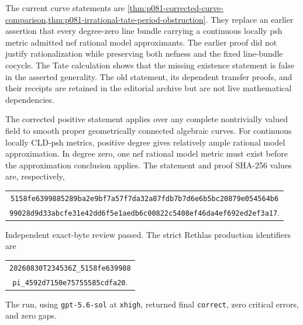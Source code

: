 The current curve statements are
\cref{thm:p081-corrected-curve-comparison,thm:p081-irrational-tate-period-obstruction}.
They replace an earlier assertion that every degree-zero line bundle
carrying a continuous locally psh metric admitted nef rational model
approximants.  The earlier proof did not justify rationalization while
preserving both nefness and the fixed line-bundle cocycle.  The Tate
calculation shows that the missing existence statement is false in
the asserted generality.  The old statement, its dependent transfer
proofs, and their receipts are retained in the editorial archive but are
not live mathematical dependencies.

The corrected positive statement applies over any complete nontrivially
valued field to smooth proper geometrically connected algebraic curves.
For continuous locally CLD-psh metrics, positive degree gives relatively
ample rational model approximation.  In degree zero, one nef rational
model metric must exist
before the approximation conclusion applies.  The statement and proof
SHA-256 values are, respectively,
\begin{center}
\small
\begin{tabular}{@{}c@{}}
\nolinkurl{5158fe6399885289ba2e9bf7a57f7da32a87fdb7b7d6e6b5bc20879e054564b6}\\
\nolinkurl{99028d9d33abcfe31e42dd6f5e1aedb6c00822c5408ef46da4ef692ed2ef3a17}.
\end{tabular}
\end{center}
Independent exact-byte review passed.  The strict Rethlas production
identifiers are
\begin{center}
\small
\begin{tabular}{@{}c@{}}
\nolinkurl{20260830T234536Z_5158fe639988}\\
\nolinkurl{pi_4592d7150e75755585cdfa20}.
\end{tabular}
\end{center}
The run, using
\texttt{gpt-5.6-sol} at \texttt{xhigh}, returned final
\texttt{correct}, zero critical errors, and zero gaps.

